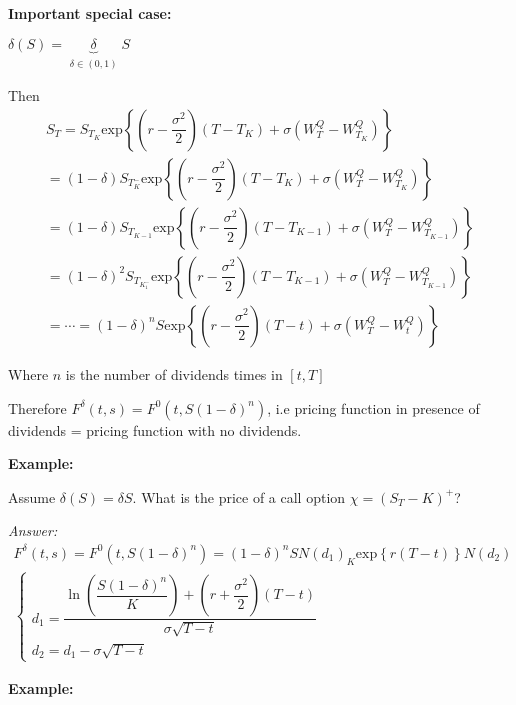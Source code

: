 \par\bigskip
\noindent\textbf{Important special case:}\par
\noindent $\delta(S) = \underbrace{\delta}_{\substack{\delta\in(0,1)}}S$\par
\noindent Then
\begin{equation*}
  \begin{gathered}
    S_T  = S_{T_K}\text{exp}\left\{\left(r-\dfrac{\sigma^2}{2}\right)(T-T_K)+\sigma(W_T^Q-W_{T_K}^Q)\right\}\\
    =(1-\delta)S_{T_K^-}\text{exp}\left\{\left(r-\dfrac{\sigma^2}{2}\right)(T-T_K)+\sigma(W_T^Q-W_{T_K}^Q)\right\}\\
    =(1-\delta)S_{T_{K-1}}\text{exp}\left\{\left(r-\dfrac{\sigma^2}{2}\right)(T-T_{K-1})+\sigma(W_T^Q-W_{T_{K-1}}^Q)\right\}\\
    =(1-\delta)^2S_{T_{K_1^-}}\text{exp}\left\{\left(r-\dfrac{\sigma^2}{2}\right)(T-T_{K-1})+\sigma(W_T^Q-W_{T_{K-1}}^Q)\right\}\\
    =\cdots=(1-\delta)^nS\text{exp}\left\{\left(r-\dfrac{\sigma^2}{2}\right)(T-t)+\sigma(W_T^Q-W_t^Q)\right\}
  \end{gathered}
\end{equation*}\par
\noindent Where $n$ is the number of dividends times in $[t,T]$\par
\noindent Therefore $F^\delta(t,s) = F^0(t,S(1-\delta)^n)$, i.e pricing function in presence of dividends = pricing function with no dividends.
\par\bigskip
\noindent\textbf{Example:}\par
\noindent Assume $\delta(S) =\delta S$. What is the price of a call option $\chi = (S_T-K)^+$?\par
\noindent\textit{Answer:} 
\begin{equation*}
  \begin{gathered}
    F^\delta(t,s) =F^0(t,S(1-\delta)^n)=(1-\delta)^nSN(d_1)_K\text{exp}\left\{r(T-t)\right\}N(d_2)\\
    \begin{cases}
      d_1 = \dfrac{\ln{\left(\dfrac{S(1-\delta)^n}{K}\right)}+\left(r+\dfrac{\sigma^2}{2}\right)(T-t)}{\sigma\sqrt{T-t}}\\
      d_2 = d_1-\sigma\sqrt{T-t}
    \end{cases}
  \end{gathered}
\end{equation*}
\par\bigskip
\noindent\textbf{Example:}\par
